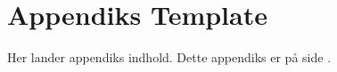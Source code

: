 \chapter{Appendiks Template}
\label{appendiks:GodtNavn}

Her lander appendiks indhold.
Dette appendiks er på side \pageref{appendiks:GodtNavn}.